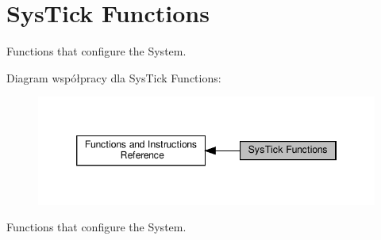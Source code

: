 \hypertarget{group___c_m_s_i_s___core___sys_tick_functions}{}\section{Sys\+Tick Functions}
\label{group___c_m_s_i_s___core___sys_tick_functions}


Functions that configure the System.  


Diagram współpracy dla Sys\+Tick Functions\+:\nopagebreak
\begin{figure}[H]
\begin{center}
\leavevmode
\includegraphics[width=346pt]{group___c_m_s_i_s___core___sys_tick_functions}
\end{center}
\end{figure}
Functions that configure the System. 

